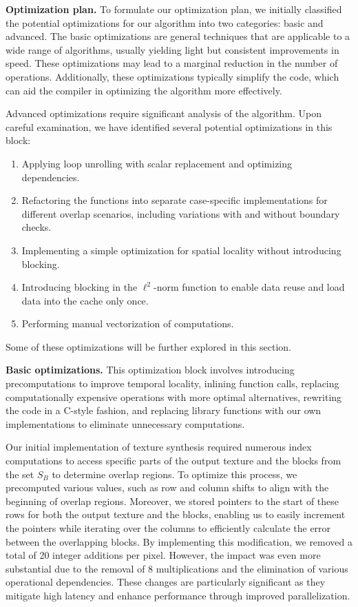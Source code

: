 \documentclass[letterpaper]{article}
\newcommand{\mypar}[1]{{\bf #1.}}
\begin{document}
\mypar{Optimization plan} 
To formulate our optimization plan, we initially classified the potential optimizations for our algorithm into two categories: basic and advanced. The basic optimizations are general techniques that are applicable to a wide range of algorithms, usually yielding light but consistent improvements in speed. These optimizations may lead to a marginal reduction in the number of operations. Additionally, these optimizations typically simplify the code, which can aid the compiler in optimizing the algorithm more effectively.

Advanced optimizations require significant analysis of the algorithm. Upon careful examination, we have identified several potential optimizations in this block:

\begin{enumerate}
\item Applying loop unrolling with scalar replacement and optimizing dependencies.
\item Refactoring the functions into separate case-specific implementations for different overlap scenarios, including variations with and without boundary checks.
\item Implementing a simple optimization for spatial locality without introducing blocking.
\item Introducing blocking in the $\ell ^2$-norm function to enable data reuse and load data into the cache only once.
\item Performing manual vectorization of computations.
\end{enumerate}

Some of these optimizations will be further explored in this section.

\mypar{Basic optimizations}
This optimization block involves introducing precomputations to improve temporal locality, inlining function calls, replacing computationally expensive operations with more optimal alternatives, rewriting the code in a C-style fashion, and replacing library functions with our own implementations to eliminate unnecessary computations.

Our initial implementation of texture synthesis required numerous index computations to access specific parts of the output texture and the blocks from the set \textit{$S_{B}$} to determine overlap regions. To optimize this process, we precomputed various values, such as row and column shifts to align with the beginning of overlap regions. Moreover, we stored pointers to the start of these rows for both the output texture and the blocks, enabling us to easily increment the pointers while iterating over the columns to efficiently calculate the error between the overlapping blocks. By implementing this modification, we removed a total of 20 integer additions per pixel. However, the impact was even more substantial due to the removal of 8 multiplications and the elimination of various operational dependencies. These changes are particularly significant as they mitigate high latency and enhance performance through improved parallelization.
\end{document}
